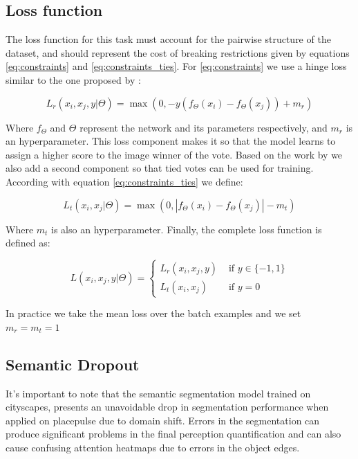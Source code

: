 \subsection{Loss function} \label{section:loss}
The loss function for this task must account for the pairwise structure of the dataset,
and should represent the cost of breaking restrictions given by equations
\ref{eq:constraints} and \ref{eq:constraints_ties}. For \ref{eq:constraints} we use
a hinge loss similar to the one proposed by :

\begin{equation}
	L_r(x_i,x_j,y | \Theta) = \max(0, -y(f_\Theta(x_i) - f_\Theta(x_j)) + m_r)
	\label{eq:r_loss}
\end{equation}

Where $f_\Theta$ and $\Theta$  represent the network and its parameters respectively, and $m_r$
is an hyperparameter. This loss component makes it so that the model learns to assign a higher
score to the image winner of the vote. Based on the work by  we also add a second component so that tied votes can
be used for training. According with equation \ref{eq:constraints_ties} we define:

\begin{equation}
	L_t(x_i,x_j | \Theta) = \max(0, |f_\Theta(x_i) - f_\Theta(x_j)| - m_t)
	\label{eq:t_loss}
\end{equation}

Where $m_t$ is also an hyperparameter. Finally, the complete loss function is defined as:

\begin{equation}
	L(x_i,x_j,y | \Theta) =\left\{\begin{matrix}
		L_r(x_i,x_j,y)&\text{ if } y \in \{-1,1\} \\
		L_t(x_i,x_j)&\text{ if } y=0
	\end{matrix}\right.
\end{equation}

In practice we take the mean loss over the batch examples and we set $m_r=m_t=1$

\subsection{Semantic Dropout}
It's important to note that the semantic segmentation model trained on cityscapes,
presents an unavoidable drop in segmentation performance when applied on placepulse
due to domain shift. Errors in the segmentation can produce  significant problems
in the final perception quantification and can also cause confusing
attention heatmaps due to errors in the object edges.

